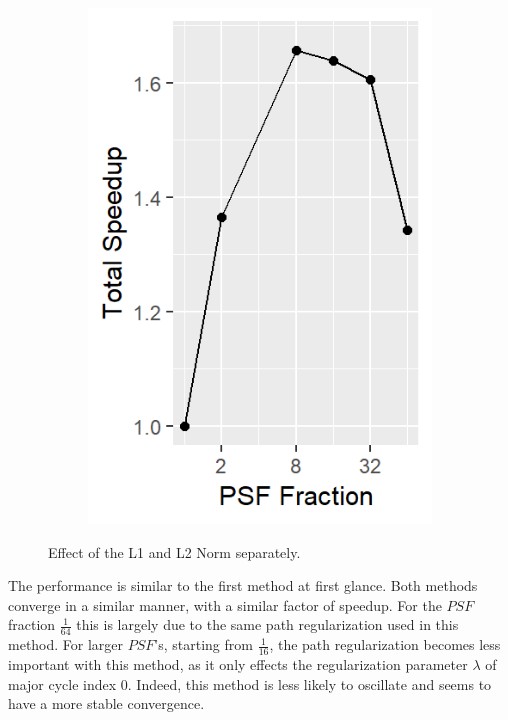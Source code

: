 \begin{figure}[h]
\begin{subfigure}[b]{0.195\linewidth}
	\end{subfigure}
	\begin{subfigure}[b]{0.195\linewidth}
		\includegraphics[width=\linewidth]{./chapters/10.results/gradient/ApproxDeconv/speedup_total.png}
	\end{subfigure}
	
	\caption{Effect of the L1 and L2 Norm separately.}
	\label{results:gradients:aproxDeconv}
\end{figure}

The performance is similar to the first method at first glance. Both methods converge in a similar manner, with a similar factor of speedup. For the $PSF$ fraction $\frac{1}{64}$ this is largely due to the same path regularization used in this method. For larger $PSF$'s, starting from $\frac{1}{16}$, the path regularization becomes less important with this method, as it only effects the regularization parameter $\lambda$ of major cycle index 0. Indeed, this method is less likely to oscillate and seems to have a more stable convergence.

